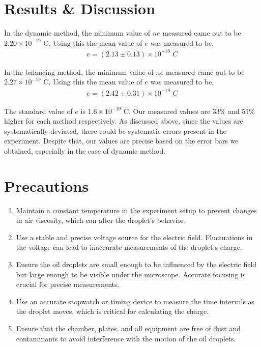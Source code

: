\section{Results \& Discussion}

In the dynamic method, the minimum value of $ne$ measured came out to be $2.20 \times 10^{-19}$ C. Using this the mean value of $e$ was measured to be,
\begin{align*}
    e = (2.13 \pm 0.13) \times 10^{-19}\,\,C
\end{align*}

In the balancing method, the minimum value of $ne$ measured came out to be $2.27 \times 10^{-19}$ C. Using this the mean value of $e$ was measured to be,
\begin{align*}
    e = (2.42 \pm 0.31) \times 10^{-19}\,\,C
\end{align*}

The standard value of $e$ is $1.6 \times 10^{-19}$ C. Our measured values are 33\% and 51\% higher for each method respectively.
As discussed above, since the values are systematically deviated, there could be systematic errors present in the experiment. 
Despite that, our values are precise based on the error bars we obtained, especially in the case of dynamic method.

\section{Precautions}

    \begin{enumerate}
        \item Maintain a constant temperature in the experiment
        setup to prevent changes in air viscosity, which can
        alter the droplet’s behavior.
        \item Use a stable and precise voltage source for the electric field.
        Fluctuations in the voltage can lead to
        inaccurate measurements of the droplet’s charge.
        \item Ensure the oil droplets are small enough to be influenced by the electric field but large enough to be
        visible under the microscope. Accurate focusing is
        crucial for precise measurements.
        \item Use an accurate stopwatch or timing device to measure the time intervals as the droplet moves, which
        is critical for calculating the charge.
        \item Ensure that the chamber, plates, and all equipment
        are free of dust and contaminants to avoid interference with the motion of the oil droplets.
    \end{enumerate}

